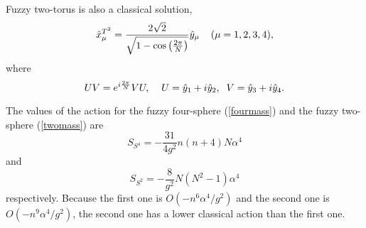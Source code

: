 \documentclass[a4paper,11pt]{article}
\begin{document}
Fuzzy two-torus is also a classical solution, 
\begin{equation}
\hat{x}_{\mu}^{T^{2}}=\frac{2\sqrt{2}}
{\sqrt{1-\cos\left(\frac{2\pi}{N}\right)}}\hat{y}_{\mu}
\hspace{0.4cm}(\mu=1,2,3,4), 
\end{equation}
where 
\begin{equation}
UV=e^{i\frac{2\pi}{N}}VU,\hspace{0.4cm}  
U=\hat{y}_{1}+i\hat{y}_{2}, \hspace{0.2cm}
V=\hat{y}_{3}+i\hat{y}_{4}. 
\end{equation}

\vspace{0.4cm}
The values of the action for the fuzzy four-sphere (\ref{fourmass}) 
and the fuzzy two-sphere (\ref{twomass}) are 
\begin{equation} 
S_{S^{4}}=-\frac{31}{4g^{2}}n(n+4)N\alpha^{4} 
\end{equation} 
and  
\begin{equation} 
S_{S^{2}}=-\frac{8}{g^{2}}N(N^{2}-1)\alpha^{4} 
\end{equation} 
respectively. Because the first one is 
$O(-n^{6}\alpha^{4}/g^{2})$ 
and the second one is $O(-n^{9}\alpha^{4}/g^{2})$, 
the second one has a lower classical action than the first one. 














\end{document}
